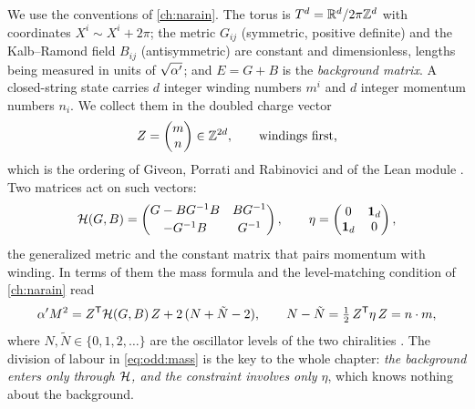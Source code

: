We use the conventions of \cref{ch:narain}. The torus is $T^d=\mathbb{R}^d/2\pi\mathbb{Z}^d$ with
coordinates $X^i\sim X^i+2\pi$; the metric $G_{ij}$ (symmetric, positive definite) and the
Kalb--Ramond field $B_{ij}$ (antisymmetric) are constant and dimensionless, lengths being
measured in units of $\sqrt{\alpha'}$; and $E=G+B$ is the \emph{background
matrix}. A closed-string state carries $d$ integer winding numbers
$m^i$ and $d$ integer momentum numbers $n_i$. We collect them in the doubled charge vector
\begin{equation}\label{eq:odd:Z}
 Z=\begin{pmatrix}m\\ n\end{pmatrix}\in\mathbb{Z}^{2d},\qquad\text{windings first,}
\end{equation}
which is the ordering of Giveon, Porrati and Rabinovici  and of the Lean module .
Two matrices act on such vectors:
\begin{equation}\label{eq:odd:Heta}
 \mathcal{H}(G,B)=\begin{pmatrix}G-BG^{-1}B&BG^{-1}\\[2pt]-G^{-1}B&G^{-1}\end{pmatrix},
 \qquad
 \eta=\begin{pmatrix}0&\mathbf 1_d\\ \mathbf 1_d&0\end{pmatrix},
\end{equation}
the generalized metric  and the constant matrix that pairs momentum with winding. In terms of
them the mass formula and the level-matching condition of
\cref{ch:narain} read
\begin{equation}\label{eq:odd:mass}
 \alpha' M^2=Z^{\mathsf T}\mathcal{H}(G,B)\,Z+2\,(N+\tilde N-2),\qquad
 N-\tilde N=\tfrac12\,Z^{\mathsf T}\eta\,Z=n\cdot m ,
\end{equation}
where $N,\tilde N\in\{0,1,2,\dots\}$ are the oscillator levels of the two chiralities
. The division of labour in \eqref{eq:odd:mass} is the key to the whole chapter:
\emph{the background enters only through $\mathcal{H}$, and the constraint involves only $\eta$},
which knows nothing about the background.


